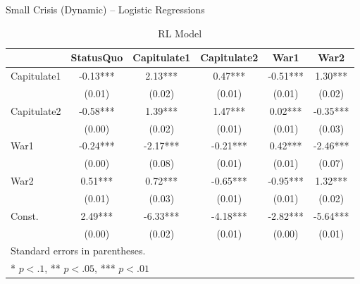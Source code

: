 \begin{table}[h!]

	\caption{Small Crisis (Dynamic) -- Logistic Regressions}
	\label{table:sc2_logits}

	\begin{subtable}{\textwidth}
	\begin{center}
		\caption{RL Model}
	\begin{tabular}{lccccc}
		\hline
		            & StatusQuo & Capitulate1 & Capitulate2 &   War1   &   War2     \\
		\hline
		Capitulate1 & -0.13***  & 2.13***     & 0.47***     & -0.51*** & 1.30***   \\
		            & (0.01)    & (0.02)      & (0.01)      & (0.01)   & (0.02)    \\
		Capitulate2 & -0.58***  & 1.39***     & 1.47***     & 0.02***  & -0.35***  \\
		            & (0.00)    & (0.02)      & (0.01)      & (0.01)   & (0.03)    \\
		War1        & -0.24***  & -2.17***    & -0.21***    & 0.42***  & -2.46***  \\
		            & (0.00)    & (0.08)      & (0.01)      & (0.01)   & (0.07)    \\
		War2        & 0.51***   & 0.72***     & -0.65***    & -0.95*** & 1.32***   \\
		            & (0.01)    & (0.03)      & (0.01)      & (0.01)   & (0.02)    \\
		Const.      & 2.49***   & -6.33***    & -4.18***    & -2.82*** & -5.64***  \\
		            & (0.00)    & (0.02)      & (0.01)      & (0.00)   & (0.01)    \\
		\hline
		\hline
		\multicolumn{6}{l}{Standard errors in parentheses.} \\
		\multicolumn{6}{l}{* $p<.1$, ** $p<.05$, *** $p<.01$} \\
		\end{tabular}
		\end{center}
		\tableSpace
	\end{subtable}


\end{table}
